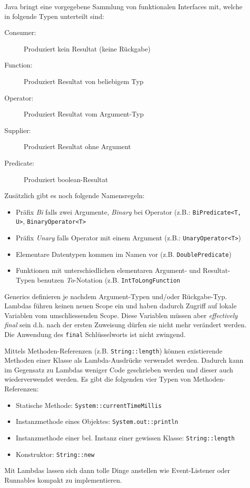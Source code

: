 Java bringt eine vorgegebene Sammlung von funktionalen Interfaces mit, welche in folgende Typen unterteilt sind:
\begin{description}
	\item[Consumer:] Produziert kein Resultat (keine Rückgabe)
	\item[Function:] Produziert Resultat von beliebigem Typ
	\item[Operator:] Produziert Resultat vom Argument-Typ
	\item[Supplier:] Produziert Resultat ohne Argument
	\item[Predicate:] Produziert boolean-Resultat
\end{description}
Zusätzlich gibt es noch folgende Namensregeln:
\begin{itemize}
	\item Präfix \textit{Bi} falls zwei Argumente, \textit{Binary} bei Operator (z.B.: \verb|BiPredicate<T, U>|, \verb|BinaryOperator<T>|
	\item Präfix \textit{Unary} falls Operator mit einem Argument (z.B.: \verb|UnaryOperator<T>|)
	\item Elementare Datentypen kommen im Namen vor (z.B. \verb|DoublePredicate|)
	\item Funktionen mit unterschiedlichen elementaren Argument- und Resultat-Typen benutzen \textit{To}-Notation (z.B. \verb|IntToLongFunction|
\end{itemize}
Generics definieren je nachdem Argument-Typen und/oder Rückgabe-Typ. Lambdas führen keinen neuen Scope ein und haben dadurch Zugriff auf lokale Variablen vom umschliessenden Scope. Diese Variablen müssen aber \textit{effectively final} sein d.h. nach der ersten Zuweisung dürfen sie nicht mehr verändert werden. Die Anwendung des \verb|final| Schlüsselworts ist nicht zwingend. 

Mittels Methoden-Referenzen (z.B. \verb|String::length|) können existierende Methoden einer Klasse als Lambda-Ausdrücke verwendet werden. Dadurch kann im Gegensatz zu Lambdas weniger Code geschrieben werden und dieser auch wiederverwendet werden. Es gibt die folgenden vier Typen von Methoden-Referenzen:
\begin{itemize}
	\item Statische Methode: \verb|System::currentTimeMillis|
	\item Instanzmethode eines Objektes: \verb|System.out::println|
	\item Instanzmethode einer bel. Instanz einer gewissen Klasse: \verb|String::length|
	\item Konstruktor: \verb|String::new|
\end{itemize}
Mit Lambdas lassen sich dann tolle Dinge anstellen wie Event-Listener oder Runnables kompakt zu implementieren. \\

